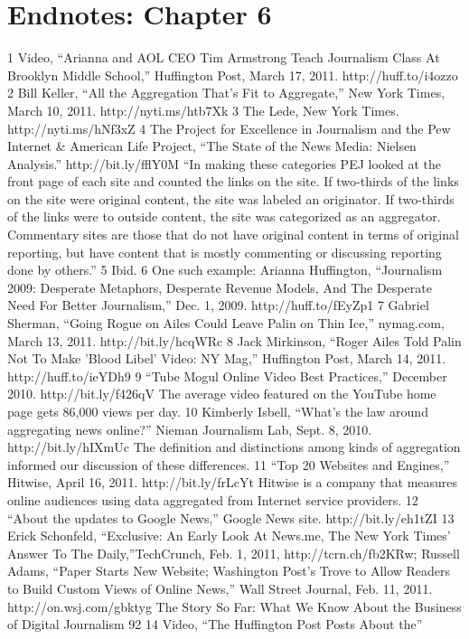 \section{Endnotes: Chapter 6}
1 Video, ``Arianna and AOL CEO Tim Armstrong Teach Journalism Class At Brooklyn Middle
School,'' Huffington Post, March 17, 2011. http://huff.to/i4ozzo
2 Bill Keller, ``All the Aggregation That's Fit to Aggregate,'' New York Times, March 10, 2011.
http://nyti.ms/htb7Xk
3 The Lede, New York Times. http://nyti.ms/hNf3xZ
4 The Project for Excellence in Journalism and the Pew Internet & American Life Project,
``The State of the News Media: Nielsen Analysis.'' http://bit.ly/fflY0M ``In making these
categories PEJ looked at the front page of each site and counted the links on the site.
If two-thirds of the links on the site were original content, the site was labeled an originator.
If two-thirds of the links were to outside content, the site was categorized as an aggregator.
Commentary sites are those that do not have original content in terms of original reporting,
but have content that is mostly commenting or discussing reporting done by others.''
5 Ibid.
6 One such example: Arianna Huffington, ``Journalism 2009: Desperate Metaphors,
Desperate Revenue Models, And The Desperate Need For Better Journalism,'' Dec. 1, 2009.
http://huff.to/fEyZp1
7 Gabriel Sherman, ``Going Rogue on Ailes Could Leave Palin on Thin Ice,'' nymag.com,
March 13, 2011. http://bit.ly/hcqWRc
8 Jack Mirkinson, ``Roger Ailes Told Palin Not To Make 'Blood Libel' Video: NY Mag,''
Huffington Post, March 14, 2011. http://huff.to/ieYDh9
9 ``Tube Mogul Online Video Best Practices,'' December 2010. http://bit.ly/f426qV The average
video featured on the YouTube home page gets 86,000 views per day.
10 Kimberly Isbell, ``What's the law around aggregating news online?'' Nieman Journalism
Lab, Sept. 8, 2010. http://bit.ly/hIXmUc The definition and distinctions among kinds of
aggregation informed our discussion of these differences.
11 ``Top 20 Websites and Engines,'' Hitwise, April 16, 2011. http://bit.ly/frLcYt Hitwise is a
company that measures online audiences using data aggregated from Internet service providers.
12 ``About the updates to Google News,'' Google News site. http://bit.ly/eh1tZI
13 Erick Schonfeld, ``Exclusive: An Early Look At News.me, The New York Times' Answer To
The Daily,''TechCrunch, Feb. 1, 2011, http://tcrn.ch/fb2KRw; Russell Adams, ``Paper Starts
New Website; Washington Post's Trove to Allow Readers to Build Custom Views of Online
News,'' Wall Street Journal, Feb. 11, 2011. http://on.wsj.com/gbktyg
The Story So Far: What We Know About the Business of Digital Journalism
92
14 Video, ``The Huffington Post Posts About the''


